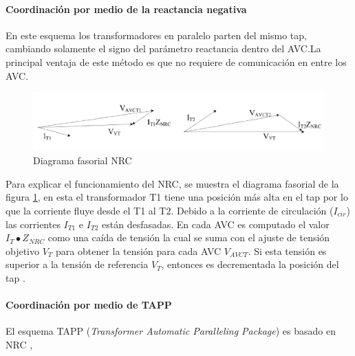\documentclass[12pt, letterpaper]{report}
\begin{document}
\paragraph{Coordinación por medio de la reactancia negativa}
En este esquema los transformadores en paralelo parten del mismo tap, cambiando solamente el signo del parámetro reactancia dentro del AVC.La principal ventaja de este método es que no requiere de comunicación en entre los AVC.
\begin{figure}[h]
\centering
\includegraphics[width=0.7\linewidth]{imagenes/cap_2/diagrama_fasorial_nrc}
\caption{Diagrama fasorial NRC}
\label{fig:diagrama_fasorial_nrc}
\end{figure}
Para explicar el funcionamiento del NRC, se muestra el diagrama fasorial de la figura \ref{fig:diagrama_fasorial_nrc}, en esta el transformador T1 tiene una posición más alta en el tap por lo que la corriente fluye desde el T1 al T2\cite{Sarimuthu2016}. Debido a la corriente de circulación ($I_{cir}$) las corrientes $I_{T1}$ e $I_{T2}$  están desfasadas. En cada AVC es computado el valor $I_{T} \bullet Z_{NRC}$ como una caída de tensión la cual se suma con el ajuste de tensión objetivo $V_{T}$ para obtener la tensión para cada AVC $V_{AVCT}$. Si esta tensión es superior a la tensión de referencia $V_{T}$, entonces es decrementada  la posición del tap \cite{Sarimuthu2016}.

\paragraph{Coordinación por medio de TAPP}
El esquema TAPP (\textit{Transformer Automatic Paralleling Package}) es basado en NRC \cite{Fila2007}, 
\end{document}
